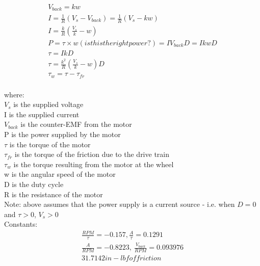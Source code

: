 \documentclass{report}
\begin{document}
\begin{gather*}
V_{back} = k w \\
I = \frac{1}{R} (V_{s} - V_{back}) = \frac{1}{R} (V_{s} - k w) \\
I  = \frac{k}{R} \left( \frac{V_{s}}{k} - w \right) \\
P = \tau \times w (is this the right power?) = I V_{back} D = I k w D \\
\tau = I k D \\
\tau = \frac{k^2}{R} \left( \frac{V_{s}}{k} - w \right) D \\
\tau _{w} = \tau - \tau _{fr} \\
\end{gather*}

where: \\
$V_s$ is the supplied voltage \\
I is the supplied current \\
$V_{back}$ is the counter-EMF from the motor \\
P is the power supplied by the motor \\
$\tau$ is the torque of the motor \\
$\tau _{fr}$ is the torque of the friction due to the drive train \\
$ \tau _{w} $ is the torque resulting from the motor at the wheel \\
w is the angular speed of the motor \\
D is the duty cycle \\
R is the resistance of the motor \\

Note: above assumes that the power supply is a current source - i.e. when $D = 0$ and $\tau > 0$, $V_s > 0$ \\

Constants:
\begin{gather*}
\frac{RPM}{\tau} = -0.157, \frac{A}{\tau} = 0.1291 \\
\frac{A}{RPM} = -0.8223, \ \frac{V_{back}}{RPM} = 0.093976 \\
31.7142 in-lbf of friction \\
\end{gather*}
\end{document}
